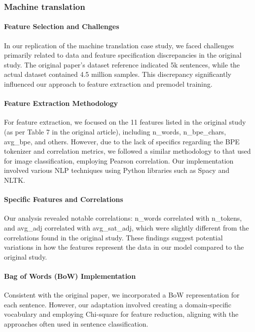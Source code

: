 \subsubsection{Machine translation}

\paragraph{Feature Selection and Challenges}
In our replication of the machine translation case study, we faced challenges primarily related to data and feature specification discrepancies in the original study. The original paper's dataset reference indicated 5k sentences, while the actual dataset contained 4.5 million samples. This discrepancy significantly influenced our approach to feature extraction and premodel training.

\paragraph{Feature Extraction Methodology}
For feature extraction, we focused on the 11 features listed in the original study (as per Table 7 in the original article), including n\_words, n\_bpe\_chars, avg\_bpe, and others. However, due to the lack of specifics regarding the BPE tokenizer and correlation metrics, we followed a similar methodology to that used for image classification, employing Pearson correlation. Our implementation involved various NLP techniques using Python libraries such as Spacy and NLTK.

\paragraph{Specific Features and Correlations}
Our analysis revealed notable correlations: n\_words correlated with n\_tokens, and avg\_adj correlated with avg\_sat\_adj, which were slightly different from the correlations found in the original study. These findings suggest potential variations in how the features represent the data in our model compared to the original study.

\paragraph{Bag of Words (BoW) Implementation}
Consistent with the original paper, we incorporated a BoW representation for each sentence. However, our adaptation involved creating a domain-specific vocabulary and employing Chi-square for feature reduction, aligning with the approaches often used in sentence classification.

